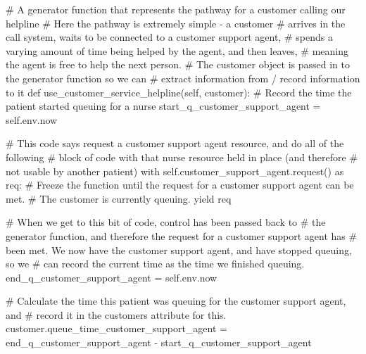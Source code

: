 \documentclass[
  letterpaper,
  DIV=11,
  numbers=noendperiod]{scrreprt}
\newenvironment{Shaded}{}{}
\newcommand{\CommentTok}[1]{\textcolor[rgb]{0.42,0.45,0.49}{#1}}
\newcommand{\ControlFlowTok}[1]{\textcolor[rgb]{0.84,0.23,0.29}{#1}}
\newcommand{\ImportTok}[1]{\textcolor[rgb]{0.01,0.18,0.38}{#1}}
\newcommand{\KeywordTok}[1]{\textcolor[rgb]{0.84,0.23,0.29}{#1}}
\newcommand{\NormalTok}[1]{\textcolor[rgb]{0.14,0.16,0.18}{#1}}
\newcommand{\OperatorTok}[1]{\textcolor[rgb]{0.14,0.16,0.18}{#1}}
\newcommand{\VariableTok}[1]{\textcolor[rgb]{0.89,0.38,0.04}{#1}}
\begin{document}
\begin{tcolorbox}
\begin{Shaded}
\begin{Highlighting}[]
    \CommentTok{\# A generator function that represents the pathway for a customer calling our helpline}
    \CommentTok{\# Here the pathway is extremely simple {-} a customer}
    \CommentTok{\# arrives in the call system, waits to be connected to a customer support agent,}
    \CommentTok{\# spends a varying amount of time being helped by the agent, and then leaves,}
    \CommentTok{\# meaning the agent is free to help the next person.}
    \CommentTok{\# The customer object is passed in to the generator function so we can}
    \CommentTok{\# extract information from / record information to it}
    \KeywordTok{def}\NormalTok{ use\_customer\_service\_helpline(}\VariableTok{self}\NormalTok{, customer):}
        \CommentTok{\# Record the time the patient started queuing for a nurse}
\NormalTok{        start\_q\_customer\_support\_agent }\OperatorTok{=} \VariableTok{self}\NormalTok{.env.now}

        \CommentTok{\# This code says request a customer support agent resource, and do all of the following}
        \CommentTok{\# block of code with that nurse resource held in place (and therefore}
        \CommentTok{\# not usable by another patient)}
        \ControlFlowTok{with} \VariableTok{self}\NormalTok{.customer\_support\_agent.request() }\ImportTok{as}\NormalTok{ req:}
            \CommentTok{\# Freeze the function until the request for a customer support agent can be met.}
            \CommentTok{\# The customer is currently queuing.}
            \ControlFlowTok{yield}\NormalTok{ req}

            \CommentTok{\# When we get to this bit of code, control has been passed back to}
            \CommentTok{\# the generator function, and therefore the request for a customer support agent has}
            \CommentTok{\# been met.  We now have the customer support agent, and have stopped queuing, so we}
            \CommentTok{\# can record the current time as the time we finished queuing.}
\NormalTok{            end\_q\_customer\_support\_agent }\OperatorTok{=} \VariableTok{self}\NormalTok{.env.now}

            \CommentTok{\# Calculate the time this patient was queuing for the customer support agent, and}
            \CommentTok{\# record it in the customer\textquotesingle{}s attribute for this.}
\NormalTok{            customer.queue\_time\_customer\_support\_agent }\OperatorTok{=}\NormalTok{ end\_q\_customer\_support\_agent }\OperatorTok{{-}}\NormalTok{ start\_q\_customer\_support\_agent}


\end{Highlighting}
\end{Shaded}
\end{tcolorbox}
\end{document}
